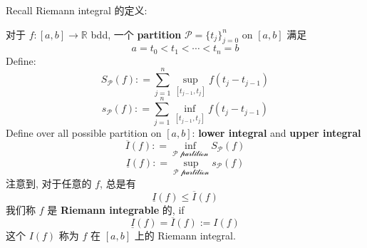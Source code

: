 \documentclass[lang=cn,11pt]{elegantbook}
\begin{document}
Recall Riemann integral 的定义: \begin{definition}
    对于 $f: [a,b] \rightarrow \mathbb{R}$ bdd, 一个 \textbf{partition} $\mathcal{P} = \{t_j\}_{j=0}^n$ on $[a,b]$ 满足 \[
    a = t_0 < t_1 < \cdots < t_n = b
    \]
Define: \[
S_{\mathcal{P}}(f) : = \sum_{j=1}^n \sup _{[t_{j-1}, t_j]}  f(t_j - t_{j-1})
\]\[
s_{\mathcal{P}}(f) : = \sum_{j=1}^n \inf _{[t_{j-1}, t_j]}  f(t_j - t_{j-1})
\]
Define over all possible partition on $[a,b]$: \textbf{lower integral} and \textbf{upper integral}\[
\overline{I}(f) : = \inf_\mathcal{P \text{ partition}} S_{\mathcal{P}}(f)
\]\[
\underline{I}(f) : = \sup_\mathcal{P \text{ partition}} s_{\mathcal{P}}(f)
\]
注意到, 对于任意的 $f$, 总是有 \[
\underline{I}(f) \leq \overline{I}(f)
\]
我们称 $f$ 是 \textbf{Riemann integrable} 的, if \[
\underline{I}(f) = \overline{I}(f) := I(f)
\]
这个 $I(f)$ 称为 $f$ 在 $[a,b]$ 上的 Riemann integral. 
\end{definition}
\end{document}
